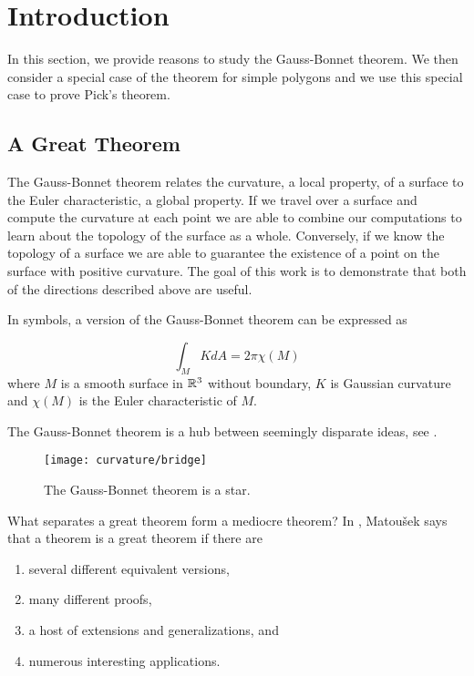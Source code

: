 \section{Introduction}
\label{sec:intro}

In this section, we provide reasons to study the Gauss-Bonnet theorem. We then consider a special case of the theorem for simple polygons and we use this special case to prove Pick's theorem.

\subsection{A Great Theorem}
The Gauss-Bonnet theorem relates the curvature, a local property, of a surface
to the Euler characteristic, a global property. If we travel over a surface and compute the curvature
at each point we are able to combine our computations to learn about the topology of the surface
as a whole. Conversely, if we know the topology of a surface we are able to 
guarantee the existence of a point on the surface with positive curvature. 
The goal of this work is to demonstrate that both of the directions described above are useful.


In symbols, a version of the Gauss-Bonnet theorem can be expressed as

\begin{equation}\label{eqn:g-b-noboundary}
		\int_MK dA =2\pi \chi(M)
\end{equation}
where $M$ is a smooth surface in $\mathbb{R}^3$ without boundary, $K$ is Gaussian curvature
and $\chi(M)$ is the Euler characteristic of $M$.


The Gauss-Bonnet theorem is a hub between seemingly disparate ideas, see . 

\begin{figure}[htb]
\centering
\texttt{[image: curvature/bridge]}
\caption{The Gauss-Bonnet theorem is a star.}
\label{fig:bridge}
\end{figure}

What separates a great theorem form a mediocre theorem?
In \cite{jm08}, Matou\v{s}ek says that a theorem is a great theorem if there are
\begin{enumerate}[(1)]
\item several different equivalent versions,
\item many different proofs,
\item a host of extensions and generalizations, and
\item numerous interesting applications.
\end{enumerate}

